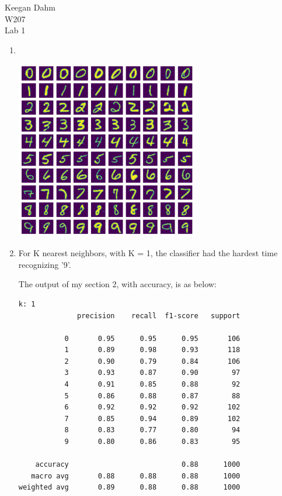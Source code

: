 \documentclass{article}
\begin{document}

\begin{flushright}
Keegan Dahm \\
W207 \\
Lab 1
\end{flushright}

\begin{enumerate}[start=1]
\item %
    ~\\
    \begin{center}\includegraphics[width=8cm]{1.png}\end{center}

\item %
    For K nearest neighbors, with K = 1, the classifier had the hardest time recognizing '9'.
    
    The output of my section 2, with accuracy, is as below:
    
    \begin{Verbatim}[commandchars=+\[\]]
k: 1
              precision    recall  f1-score   support

           0       0.95      0.95      0.95       106
           1       0.89      0.98      0.93       118
           2       0.90      0.79      0.84       106
           3       0.93      0.87      0.90        97
           4       0.91      0.85      0.88        92
           5       0.86      0.88      0.87        88
           6       0.92      0.92      0.92       102
           7       0.85      0.94      0.89       102
           8       0.83      0.77      0.80        94
           9       0.80      0.86      0.83        95

    accuracy                           0.88      1000
   macro avg       0.88      0.88      0.88      1000
weighted avg       0.89      0.88      0.88      1000


\end{Verbatim}
\end{enumerate}
\end{document}
